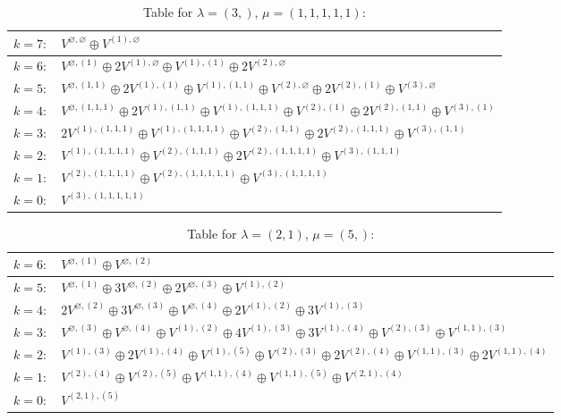 \documentclass[a4paper,12pt]{article}
\begin{document}
\renewcommand{\arraystretch}{1.6} 
\begin{table}[H]
\centering
\caption{Table for $\lambda = (3,)$, $\mu = (1, 1, 1, 1, 1)$:}
\begin{tabular}{|>{\centering\arraybackslash}p{15cm}|}
\hline
 $k = 7: \quad V^{\varnothing, \varnothing} \oplus V^{(1), \varnothing} $ \\ \hline
 $k = 6: \quad V^{\varnothing, (1)} \oplus 2 V^{(1), \varnothing} \oplus V^{(1), (1)} \oplus 2 V^{(2), \varnothing} $ \\ \hline
 $k = 5: \quad V^{\varnothing, (1, 1)} \oplus 2 V^{(1), (1)} \oplus V^{(1), (1, 1)} \oplus V^{(2), \varnothing} \oplus 2 V^{(2), (1)} \oplus V^{(3), \varnothing} $ \\ \hline
 $k = 4: \quad V^{\varnothing, (1, 1, 1)} \oplus 2 V^{(1), (1, 1)} \oplus V^{(1), (1, 1, 1)} \oplus V^{(2), (1)} \oplus 2 V^{(2), (1, 1)} \oplus V^{(3), (1)} $ \\ \hline
 $k = 3: \quad 2 V^{(1), (1, 1, 1)} \oplus V^{(1), (1, 1, 1, 1)} \oplus V^{(2), (1, 1)} \oplus 2 V^{(2), (1, 1, 1)} \oplus V^{(3), (1, 1)} $ \\ \hline
 $k = 2: \quad V^{(1), (1, 1, 1, 1)} \oplus V^{(2), (1, 1, 1)} \oplus 2 V^{(2), (1, 1, 1, 1)} \oplus V^{(3), (1, 1, 1)} $ \\ \hline
 $k = 1: \quad V^{(2), (1, 1, 1, 1)} \oplus V^{(2), (1, 1, 1, 1, 1)} \oplus V^{(3), (1, 1, 1, 1)} $ \\ \hline
 $k = 0: \quad V^{(3), (1, 1, 1, 1, 1)} $ \\ \hline
\end{tabular}
\end{table}

\renewcommand{\arraystretch}{1.6} 
\begin{table}[H]
\centering
\caption{Table for $\lambda = (2, 1)$, $\mu = (5,)$:}
\begin{tabular}{|>{\centering\arraybackslash}p{15cm}|}
\hline
 $k = 6: \quad V^{\varnothing, (1)} \oplus V^{\varnothing, (2)} $ \\ \hline
 $k = 5: \quad V^{\varnothing, (1)} \oplus 3 V^{\varnothing, (2)} \oplus 2 V^{\varnothing, (3)} \oplus V^{(1), (2)} $ \\ \hline
 $k = 4: \quad 2 V^{\varnothing, (2)} \oplus 3 V^{\varnothing, (3)} \oplus V^{\varnothing, (4)} \oplus 2 V^{(1), (2)} \oplus 3 V^{(1), (3)} $ \\ \hline
 $k = 3: \quad V^{\varnothing, (3)} \oplus V^{\varnothing, (4)} \oplus V^{(1), (2)} \oplus 4 V^{(1), (3)} \oplus 3 V^{(1), (4)} \oplus V^{(2), (3)} \oplus V^{(1, 1), (3)} $ \\ \hline
 $k = 2: \quad V^{(1), (3)} \oplus 2 V^{(1), (4)} \oplus V^{(1), (5)} \oplus V^{(2), (3)} \oplus 2 V^{(2), (4)} \oplus V^{(1, 1), (3)} \oplus 2 V^{(1, 1), (4)} $ \\ \hline
 $k = 1: \quad V^{(2), (4)} \oplus V^{(2), (5)} \oplus V^{(1, 1), (4)} \oplus V^{(1, 1), (5)} \oplus V^{(2, 1), (4)} $ \\ \hline
 $k = 0: \quad V^{(2, 1), (5)} $ \\ \hline
\end{tabular}
\end{table}
\end{document}
